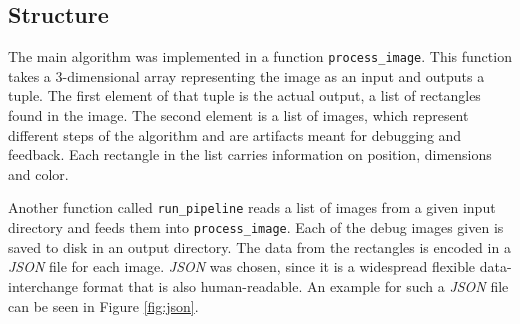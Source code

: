 \documentclass[serif,article,noparskip]{agse-thesis}
\begin{document}
\subsection{Structure} \label{structure}

The main algorithm was implemented in a function \texttt{process\_image}. This
function takes a 3-dimensional array representing the image as an input and
outputs a tuple. The first element of that tuple is the actual output, a list of
rectangles found in the image. The second element is a list of images, which
represent different steps of the algorithm and are artifacts meant for debugging
and feedback. Each rectangle in the list carries information on position, dimensions
and color.


Another function called \texttt{run\_pipeline} reads a list of images from a
given input directory and feeds them into \texttt{process\_image}. Each of the
debug images given is saved to disk in an output directory. The data from the
rectangles is encoded in a \textit{JSON} file for each image. \textit{JSON} was
chosen, since it is a widespread flexible data-interchange format that is also
human-readable. An example for such a \textit{JSON} file can be seen in Figure
\ref{fig:json}.
\end{document}
